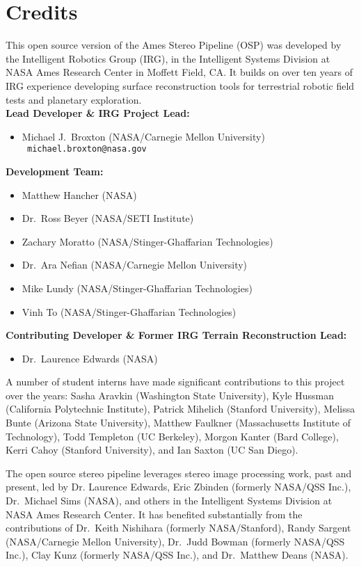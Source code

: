 
\chapter*{Credits}

This open source version of the Ames Stereo Pipeline (OSP) was
developed by the Intelligent Robotics Group (IRG), in the Intelligent
Systems Division at NASA Ames Research Center in Moffett Field, CA. It
builds on over ten years of IRG experience developing surface
reconstruction tools for terrestrial robotic field tests and planetary
exploration. \\

{\bf Lead Developer \& IRG Project Lead:}
\begin {itemize} 
\item Michael J.~Broxton (NASA/Carnegie Mellon University)\\ {\tt
  michael.broxton@nasa.gov}\\
\end{itemize}

{\bf Development Team:}
\begin{itemize}
\item Matthew Hancher (NASA)
\item Dr.~Ross Beyer (NASA/SETI Institute)
\item Zachary Moratto (NASA/Stinger-Ghaffarian Technologies)
\item Dr.~Ara Nefian (NASA/Carnegie Mellon University)
\item Mike Lundy (NASA/Stinger-Ghaffarian Technologies)
\item Vinh To (NASA/Stinger-Ghaffarian Technologies)
\end{itemize}

{\bf Contributing Developer \& Former IRG Terrain Reconstruction Lead:}
\begin{itemize}
\item Dr.\ Laurence Edwards (NASA)
\end{itemize}

A number of student interns have made significant contributions to
this project over the years: Sasha Aravkin (Washington State
University), Kyle Hussman (California Polytechnic Institute), Patrick
Mihelich (Stanford University), Melissa Bunte (Arizona State
University), Matthew Faulkner (Massachusetts Institute of Technology),
Todd Templeton (UC Berkeley), Morgon Kanter (Bard College), Kerri
Cahoy (Stanford University), and Ian Saxton (UC San Diego).

The open source stereo pipeline leverages stereo image processing
work, past and present, led by Dr. Laurence Edwards, Eric Zbinden
(formerly NASA/QSS Inc.), Dr.~Michael Sims (NASA), and others in the
Intelligent Systems Division at NASA Ames Research Center. It has
benefited substantially from the contributions of Dr.~Keith Nishihara
(formerly NASA/Stanford), Randy Sargent (NASA/Carnegie Mellon
University), Dr.~Judd Bowman (formerly NASA/QSS Inc.), Clay Kunz
(formerly NASA/QSS Inc.), and Dr.~Matthew Deans (NASA).

